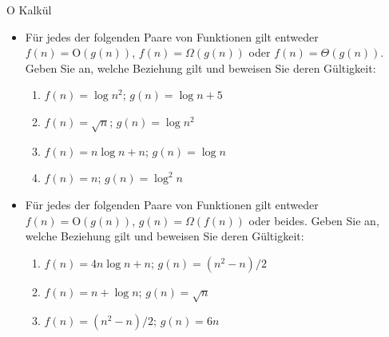 \documentclass[18pt]{beamer}
\newcommand{\Oh}{\mathrm{O}}
\begin{document}
\begin{frame}{O Kalkül}
  \begin{itemize}
    \item Für jedes der folgenden Paare von Funktionen gilt entweder $f(n) = \Oh (g(n))$, $f(n) = \Omega(g(n))$ oder $f(n) = \Theta(g(n))$. Geben Sie an, welche Beziehung gilt und beweisen Sie deren Gültigkeit:
    \begin{enumerate}
      \item  $f(n) = \log n^2$; $g(n)= \log n + 5$
      \item  $f(n) = \sqrt{n}$; $g(n)= \log n^2$
      \item  $f(n) = n \log n + n$; $g(n)= \log n$
      \item  $f(n) = n$; $g(n)= \log^2 n$
    \end{enumerate}
    \item Für jedes der folgenden Paare von Funktionen gilt entweder $f(n) = \Oh(g(n))$, $g(n) = \Omega(f(n))$ oder beides. Geben Sie an, welche Beziehung gilt und beweisen Sie deren Gültigkeit:
    \begin{enumerate}
      \item  $f(n) = 4n \log n +n$; $g(n)= (n^2 -n) / 2$
      \item  $f(n) = n + \log n$; $g(n)= \sqrt{n}$
      \item  $f(n) = (n^2 -n)/2$; $g(n)= 6n$
    \end{enumerate}
  \end{itemize}
\end{frame}
\end{document}
